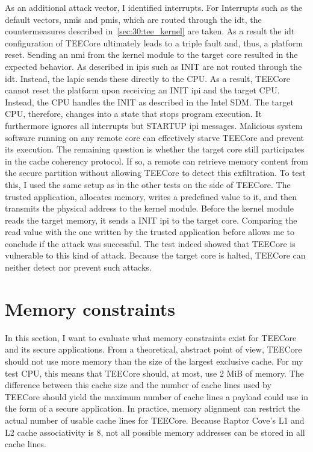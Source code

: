 As an additional attack vector, I identified interrupts. For Interrupts such as
the default vectors, \glspl{nmi} and \glspl{pmi}, which are routed through the
\gls{idt}, the countermeasures described in~\ref{sec:30:tee_kernel} are taken.
As a result the \gls{idt} configuration of TEECore ultimately leads to a triple
fault and, thus, a platform reset. Sending an \gls{nmi} from the kernel module
to the target core resulted in the expected behavior. As described in
 \glspl{ipi} such as INIT are not routed through the \gls{idt}.
Instead, the \gls{lapic} sends these directly to the CPU. As a result, TEECore
cannot reset the platform upon receiving an INIT \gls{ipi} and the target CPU.
Instead, the CPU handles the INIT as described in the Intel SDM. The target CPU,
therefore, changes into a state that stops program execution. It furthermore
ignores all interrupts but STARTUP \gls{ipi} messages. Malicious system software
running on any remote core can effectively starve TEECore and prevent its
execution. The remaining question is whether the target core still participates
in the cache coherency protocol. If so, a remote can retrieve memory content
from the secure partition without allowing TEECore to detect this exfiltration.
To test this, I used the same setup as in the other tests on the side of
TEECore. The trusted application, allocates memory, writes a predefined value to
it, and then transmits the physical address to the kernel module. Before the
kernel module reads the target memory, it sends a INIT \gls{ipi} to the target
core. Comparing the read value with the one written by the trusted application
before allows me to conclude if the attack was successful. The test indeed
showed that TEECore is vulnerable to this kind of attack. Because the target
core is halted, TEECore can neither detect nor prevent such attacks.

\section{Memory constraints}
In this section, I want to evaluate what memory constraints exist for TEECore
and its secure applications. From a theoretical, abstract point of view, TEECore
should not use more memory than the size of the largest exclusive cache. For my
test CPU, this means that TEECore should, at most, use 2 MiB of memory. The
difference between this cache size and the number of cache lines used by TEECore
should yield the maximum number of cache lines a payload could use in the form
of a secure application. In practice, memory alignment can restrict the actual
number of usable cache lines for TEECore. Because Raptor Cove's L1 and L2 cache
associativity is 8, not all possible memory addresses can be stored in all cache
lines.\\

